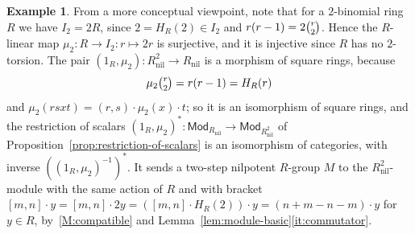 \documentclass[reqno,a4paper]{amsart}
\renewcommand{\binom}{\tbinom} %
\theoremstyle{plain}
\theoremstyle{definition}
\newtheorem{example}[subsection]{Example}
\newcommand{\Mod}{\ensuremath{\mathsf{Mod}}}
\DeclareMathOperator{\nil}{nil}
\newcommand{\brk}[2]{\ensuremath{[#1,#2]}}
\begin{document}
\begin{example}
  From a more conceptual viewpoint, note that for a \(2\)-binomial ring \(R\) we have \(I_{2}=2R\), since \(2=H_{R}(2)\in I_{2}\) and \(r(r-1)=2\binom{r}{2}\). Hence the \(R\)-linear map \(\mu_{2}\colon R\to I_{2}\colon r\mapsto 2r\) is surjective, and it is injective since \(R\) has no \(2\)-torsion. The pair \((1_{R},\mu_{2})\colon R_{\nil}^{2}\to R_{\nil}\) is a morphism of square rings, because
  \[
    \mu_{2}\binom{r}{2}=r(r-1)=H_{R}(r)
  \]
  and \(\mu_{2}(rsxt)=(r,s)\cdot\mu_{2}(x)\cdot t\); so it is an isomorphism of square rings, and the restriction of scalars \((1_{R},\mu_{2})^{*}\colon \Mod_{R_{\nil}}\to\Mod_{R_{\nil}^{2}}\) of Proposition~\ref{prop:restriction-of-scalars} is an isomorphism of categories, with inverse \(((1_{R},\mu_{2})^{-1})^{*}\). It sends a two-step nilpotent \(R\)-group \(M\) to the \(R_{\nil}^{2}\)-module with the same action of \(R\) and with bracket \(\brk{m}{n}\cdot y=\brk{m}{n}\cdot 2y=(\brk{m}{n}\cdot H_{R}(2))\cdot y=(n+m-n-m)\cdot y\) for \(y\in R\), by~\ref{M:compatible} and Lemma~\ref{lem:module-basic}\ref{it:commutator}.


\end{example}
\end{document}
